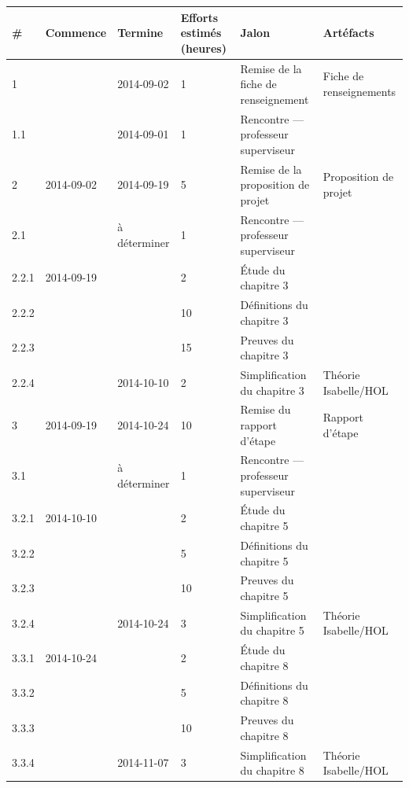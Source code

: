 \documentclass[a4paper, oneside, 12pt, titlepage]{article}
\begin{document}
\begin{landscape}
\begin{table}[!h]
  \small
  \centering
  \begin{tabular}{|l||l|l|p{2cm}||l|l|}
    \hline
    \textbf{\#} &
    \textbf{Commence} &
    \textbf{Termine} &
    \textbf{Efforts estimés (heures)} &
    \textbf{Jalon} &
    \textbf{Artéfacts} \\
    \hline \hline
    1   & & 2014-09-02 & 1 & Remise de la fiche de renseignement & Fiche de renseignements \\
    1.1 & & 2014-09-01 & 1 & Rencontre --- professeur superviseur & \\
    \hline
    2   & 2014-09-02 & 2014-09-19   & 5 & Remise de la proposition de projet & Proposition de projet \\
    2.1 &            & à déterminer & 1 & Rencontre --- professeur superviseur & \\
    \hline
    2.2.1 & 2014-09-19 &            & 2 & Étude du chapitre 3 & \\
    2.2.2 &            &            & 10 & Définitions du chapitre 3 & \\
    2.2.3 &            &            & 15 & Preuves du chapitre 3 & \\
    2.2.4 &            & 2014-10-10 & 2 & Simplification du chapitre 3 & Théorie Isabelle/HOL \\
    \hline
    3   & 2014-09-19 & 2014-10-24 & 10 & Remise du rapport d'étape & Rapport d'étape \\
    3.1 &            & à déterminer & 1 & Rencontre --- professeur superviseur & \\
    \hline
    3.2.1 & 2014-10-10 &            & 2 & Étude du chapitre 5 & \\
    3.2.2 &            &            & 5 & Définitions du chapitre 5 & \\
    3.2.3 &            &            & 10 & Preuves du chapitre 5 & \\
    3.2.4 &            & 2014-10-24 & 3 & Simplification du chapitre 5 & Théorie Isabelle/HOL \\
    \hline
    3.3.1 & 2014-10-24 &            & 2 & Étude du chapitre 8 & \\
    3.3.2 &            &            & 5 & Définitions du chapitre 8 & \\
    3.3.3 &            &            & 10 & Preuves du chapitre 8 & \\
    3.3.4 &            & 2014-11-07 & 3 & Simplification du chapitre 8 & Théorie Isabelle/HOL \\

\end{tabular}
\end{table}
\end{landscape}
\end{document}
